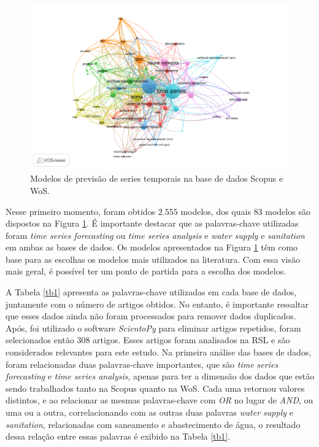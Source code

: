 \begin{figure}[!htb]
	\centering
	\caption{Modelos de previsão de series temporais na base de dados Scopus e WoS.}
	\label{fig:scopus-09-08}
	\includegraphics[width=\linewidth]{Revisao/Figuras/base-wos-scopus.pdf}
	
	
\end{figure}

Nesse primeiro momento, foram obtidos $2.555$ modelos, dos quais $83$ modelos são dispostos na Figura \ref{fig:scopus-09-08}. É importante destacar que as palavras-chave utilizadas foram \textit{time series forecasting} ou \textit{time series analysis} e \textit{water supply} e \textit{sanitation} em ambas as bases de dados. Os modelos apresentados na Figura \ref{fig:scopus-09-08} têm como base para as escolhas os modelos mais utilizados na literatura. Com essa visão mais geral, é possível ter um ponto de partida para a escolha dos modelos.

A Tabela \ref{tb1} apresenta as palavras-chave utilizadas em cada base de dados, juntamente com o número de artigos obtidos. No entanto, é importante ressaltar que esses dados ainda não foram processados para remover dados duplicados. Após, foi utilizado o software \textit{ScientoPy} para eliminar artigos repetidos, foram selecionados então $308$ artigos. Esses artigos foram analisados na RSL e são considerados relevantes para este estudo. Na primeira análise das bases de dados, foram relacionadas duas palavras-chave importantes, que são \textit{time series forecasting} e \textit{time series analysis}, apenas para ter a dimensão dos dados que estão sendo trabalhados tanto na Scopus quanto na WoS. Cada uma retornou valores distintos, e ao relacionar as mesmas palavras-chave com \textit{OR} no lugar de \textit{AND}, ou uma ou a outra, correlacionando com as outras duas palavras \textit{water supply} e \textit{sanitation}, relacionadas com saneamento e abastecimento de água, o resultado dessa relação entre essas palavras é exibido na Tabela \ref{tb1}.

